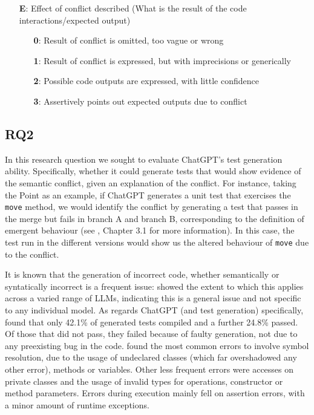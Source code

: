 \begin{itemize}
  \item[\textbf{E}:] Effect of conflict described (What is the result of the code interactions/expected output)
  \begin{itemize}
    \item[\textbf{0}:] Result of conflict is omitted, too vague or wrong
    \item[\textbf{1}:] Result of conflict is expressed, but with imprecisions or generically
    \item[\textbf{2}:] Possible code outputs are expressed, with little confidence
    \item[\textbf{3}:] Assertively points out expected outputs due to conflict
  \end{itemize}
\end{itemize}


\subsection{RQ2}

In this research question we sought to evaluate ChatGPT's test generation ability. Specifically, whether it could generate tests that would show evidence of the semantic conflict, given an explanation of the conflict.
For instance, taking the Point as an example, if ChatGPT generates a unit test that exercises the \texttt{move} method, we would identify the conflict by generating a test that passes in the merge but fails in branch A and branch B, corresponding to the definition of emergent behaviour (see \citet{kn:nuno}, Chapter 3.1 for more information).
In this case, the test run in the different versions would show us the altered behaviour of \texttt{move} due to the conflict.

It is known that the generation of incorrect code, whether semantically or syntatically incorrect is a frequent issue:  showed the extent to which this applies across a varied range of LLMs,
indicating this is a general issue and not specific to any individual model. As regards ChatGPT (and test generation) specifically,  found that only 42.1\% of generated tests compiled and a further
24.8\% passed. Of those that did not pass, they failed because of faulty generation, not due to any preexisting bug in the code.
 found the most common errors to involve symbol resolution, due to the usage of undeclared classes (which far overshadowed any other error), methods or variables. Other less frequent errors were accesses on private classes and the usage
of invalid types for operations, constructor or method parameters.
Errors during execution mainly fell on assertion errors, with a minor amount of runtime exceptions.

